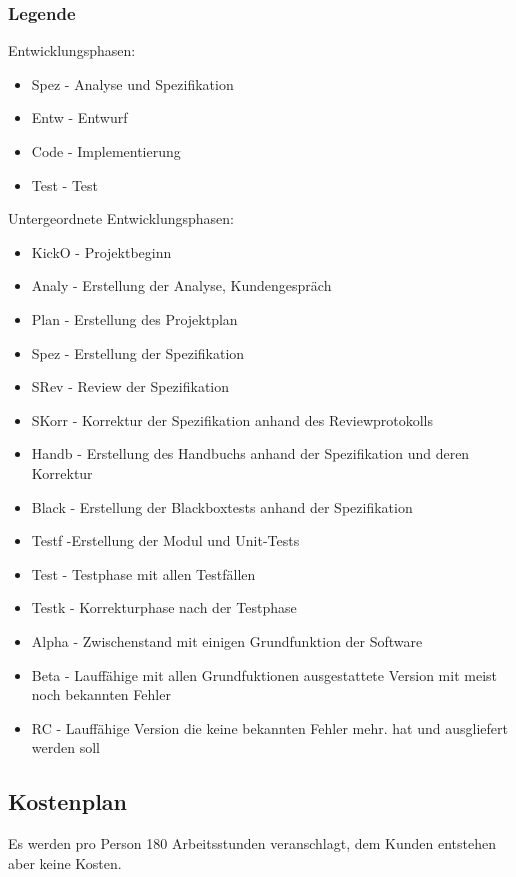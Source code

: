 \documentclass[a4paper,10pt]{scrartcl}
\begin{document}
\subsubsection{Legende}
Entwicklungsphasen:
\begin{itemize}
\item Spez - Analyse und Spezifikation
\item Entw - Entwurf
\item Code - Implementierung
\item Test - Test
\end{itemize}
Untergeordnete Entwicklungsphasen:
\begin{itemize}
\item KickO - Projektbeginn
\item Analy - Erstellung der Analyse, Kundengespräch
\item Plan - Erstellung des Projektplan
\item Spez - Erstellung der Spezifikation
\item SRev - Review der Spezifikation
\item SKorr - Korrektur der Spezifikation anhand des Reviewprotokolls
\item Handb - Erstellung des Handbuchs anhand der Spezifikation und deren Korrektur
\item Black - Erstellung der Blackboxtests anhand der Spezifikation
\item Testf -Erstellung der Modul und Unit-Tests 
\item Test - Testphase mit allen Testfällen
\item Testk - Korrekturphase nach der Testphase
\item Alpha - Zwischenstand mit einigen Grundfunktion der Software
\item Beta - Lauffähige mit allen Grundfuktionen ausgestattete Version mit meist noch bekannten Fehler
\item RC - Lauffähige Version die keine bekannten Fehler mehr. hat und ausgliefert werden soll

\end{itemize}
\subsection{Kostenplan}
Es werden pro Person 180 Arbeitsstunden veranschlagt, dem Kunden entstehen aber keine Kosten.
\end{document}
